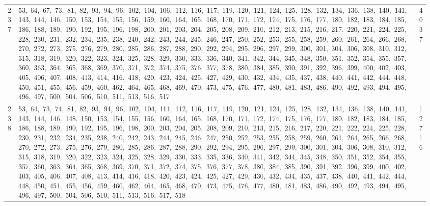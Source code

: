 \begin{longtable}{c|p{}|r}
237 & 53,\ 64,\ 67,\ 73,\ 81,\ 82,\ 93,\ 94,\ 96,\ 102,\ 104,\ 106,\ 112,\ 116,\ 117,\ 119,\ 120,\ 121,\ 124,\ 125,\ 128,\ 132,\ 134,\ 136,\ 138,\ 140,\ 141,\ 143,\ 144,\ 146,\ 150,\ 153,\ 154,\ 155,\ 156,\ 159,\ 160,\ 164,\ 165,\ 168,\ 170,\ 171,\ 172,\ 174,\ 175,\ 176,\ 177,\ 180,\ 182,\ 183,\ 184,\ 185,\ 186,\ 188,\ 189,\ 190,\ 192,\ 195,\ 196,\ 198,\ 200,\ 201,\ 203,\ 204,\ 205,\ 208,\ 209,\ 210,\ 212,\ 213,\ 215,\ 216,\ 217,\ 220,\ 221,\ 224,\ 225,\ 228,\ 230,\ 231,\ 232,\ 234,\ 235,\ 238,\ 240,\ 242,\ 243,\ 244,\ 245,\ 246,\ 247,\ 250,\ 252,\ 253,\ 255,\ 258,\ 259,\ 260,\ 261,\ 264,\ 266,\ 268,\ 270,\ 272,\ 273,\ 275,\ 276,\ 279,\ 280,\ 285,\ 286,\ 287,\ 288,\ 290,\ 292,\ 294,\ 295,\ 296,\ 297,\ 299,\ 300,\ 301,\ 304,\ 306,\ 308,\ 310,\ 312,\ 315,\ 318,\ 319,\ 320,\ 322,\ 323,\ 324,\ 325,\ 328,\ 329,\ 330,\ 333,\ 336,\ 340,\ 341,\ 342,\ 344,\ 345,\ 348,\ 350,\ 351,\ 352,\ 354,\ 355,\ 357,\ 360,\ 363,\ 364,\ 365,\ 368,\ 369,\ 370,\ 371,\ 372,\ 374,\ 375,\ 376,\ 377,\ 378,\ 380,\ 384,\ 385,\ 390,\ 391,\ 392,\ 396,\ 399,\ 400,\ 402,\ 403,\ 405,\ 406,\ 407,\ 408,\ 413,\ 414,\ 416,\ 418,\ 420,\ 423,\ 424,\ 425,\ 427,\ 429,\ 430,\ 432,\ 434,\ 435,\ 437,\ 438,\ 440,\ 441,\ 442,\ 444,\ 448,\ 450,\ 451,\ 455,\ 456,\ 459,\ 460,\ 462,\ 464,\ 465,\ 468,\ 469,\ 470,\ 473,\ 475,\ 476,\ 477,\ 480,\ 481,\ 483,\ 486,\ 490,\ 492,\ 493,\ 494,\ 495,\ 496,\ 497,\ 500,\ 504,\ 506,\ 510,\ 511,\ 513,\ 516,\ 517 & 4037 \\
238 & 53,\ 64,\ 73,\ 74,\ 81,\ 82,\ 93,\ 94,\ 96,\ 102,\ 104,\ 111,\ 112,\ 116,\ 117,\ 119,\ 120,\ 121,\ 124,\ 125,\ 128,\ 132,\ 134,\ 136,\ 138,\ 140,\ 141,\ 143,\ 144,\ 146,\ 148,\ 150,\ 153,\ 154,\ 155,\ 156,\ 160,\ 164,\ 165,\ 168,\ 170,\ 171,\ 172,\ 174,\ 175,\ 176,\ 177,\ 180,\ 182,\ 183,\ 184,\ 185,\ 186,\ 188,\ 189,\ 190,\ 192,\ 195,\ 196,\ 198,\ 200,\ 203,\ 204,\ 205,\ 208,\ 209,\ 210,\ 213,\ 215,\ 216,\ 217,\ 220,\ 221,\ 222,\ 224,\ 225,\ 228,\ 230,\ 231,\ 232,\ 234,\ 235,\ 238,\ 240,\ 242,\ 243,\ 244,\ 245,\ 246,\ 247,\ 250,\ 252,\ 253,\ 255,\ 258,\ 259,\ 260,\ 261,\ 264,\ 265,\ 266,\ 268,\ 270,\ 272,\ 273,\ 275,\ 276,\ 279,\ 280,\ 285,\ 286,\ 287,\ 288,\ 290,\ 292,\ 294,\ 295,\ 296,\ 297,\ 299,\ 300,\ 301,\ 304,\ 306,\ 308,\ 310,\ 312,\ 315,\ 318,\ 319,\ 320,\ 322,\ 323,\ 324,\ 325,\ 328,\ 329,\ 330,\ 333,\ 335,\ 336,\ 340,\ 341,\ 342,\ 344,\ 345,\ 348,\ 350,\ 351,\ 352,\ 354,\ 355,\ 357,\ 360,\ 363,\ 364,\ 365,\ 368,\ 369,\ 370,\ 371,\ 372,\ 374,\ 375,\ 376,\ 377,\ 378,\ 380,\ 384,\ 385,\ 390,\ 391,\ 392,\ 396,\ 399,\ 400,\ 402,\ 403,\ 405,\ 406,\ 407,\ 408,\ 413,\ 414,\ 416,\ 418,\ 420,\ 423,\ 424,\ 425,\ 427,\ 429,\ 430,\ 432,\ 434,\ 435,\ 437,\ 438,\ 440,\ 441,\ 442,\ 444,\ 448,\ 450,\ 451,\ 455,\ 456,\ 459,\ 460,\ 462,\ 464,\ 465,\ 468,\ 470,\ 473,\ 475,\ 476,\ 477,\ 480,\ 481,\ 483,\ 486,\ 490,\ 492,\ 493,\ 494,\ 495,\ 496,\ 497,\ 500,\ 504,\ 506,\ 510,\ 511,\ 513,\ 516,\ 517,\ 518 & 12716 \\

\end{longtable}
